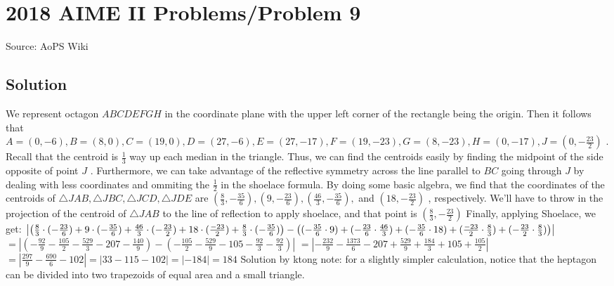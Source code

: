 \documentclass[12pt]{article}
\begin{document}
\section*{{2018 AIME II Problems/Problem 9}}
Source: AoPS Wiki

\subsection*{Solution}
We represent octagon $ABCDEFGH$ in the coordinate plane with the upper left corner of the rectangle being the origin. Then it follows that $A=(0,-6), B=(8, 0), C=(19,0), D=(27, -6), E=(27, -17), F=(19, -23), G=(8, -23), H=(0, -17), J=(0, -\frac{23}{2})$ . Recall that the centroid is $\frac{1}{3}$ way up each median in the triangle. Thus, we can find the centroids easily by finding the midpoint of the side opposite of point $J$ . Furthermore, we can take advantage of the reflective symmetry across the line parallel to $BC$ going through $J$ by dealing with less coordinates and ommiting the $\frac{1}{2}$ in the shoelace formula. By doing some basic algebra, we find that the coordinates of the centroids of $\bigtriangleup JAB, \bigtriangleup JBC, \bigtriangleup JCD, \bigtriangleup JDE$ are $\left(\frac{8}{3}, -\frac{35}{6}\right), \left(9, -\frac{23}{6}\right), \left(\frac{46}{3}, -\frac{35}{6}\right),$ and $\left(18, -\frac{23}{2}\right)$ , respectively. We'll have to throw in the projection of the centroid of $\bigtriangleup JAB$ to the line of reflection to apply shoelace, and that point is $\left( \frac{8}{3}, -\frac{23}{2}\right)$ Finally, applying Shoelace, we get: $\left|\left(\frac{8}{3}\cdot (-\frac{23}{6})+9\cdot (-\frac{35}{6})+\frac{46}{3}\cdot (-\frac{23}{2})+18\cdot (\frac{-23}{2})+\frac{8}{3}\cdot (-\frac{35}{6})\right) - \left((-\frac{35}{6}\cdot 9) +\\(-\frac{23}{6}\cdot \frac{46}{3})+ (-\frac{35}{6}\cdot 18)+(\frac{-23}{2}\cdot \frac{8}{3})+(-\frac{23}{2}\cdot \frac{8}{3})\right)\right|$ $=\left|\left(-\frac{92}{9}-\frac{105}{2}-\frac{529}{3}-207-\frac{140}{9}\right)-\left(-\frac{105}{2}-\frac{529}{9}-105-\frac{92}{3}-\frac{92}{3}\right)\right|$ $=\left|-\frac{232}{9}-\frac{1373}{6}-207+\frac{529}{9}+\frac{184}{3}+105+\frac{105}{2}\right|$ $=\left|\frac{297}{9}-\frac{690}{6}-102\right|=\left| 33-115-102\right|=\left|-184\right|=\boxed{184}$ Solution by ktong note: for a slightly simpler calculation, notice that the heptagon can be divided into two trapezoids of equal area and a small triangle.
\end{document}
